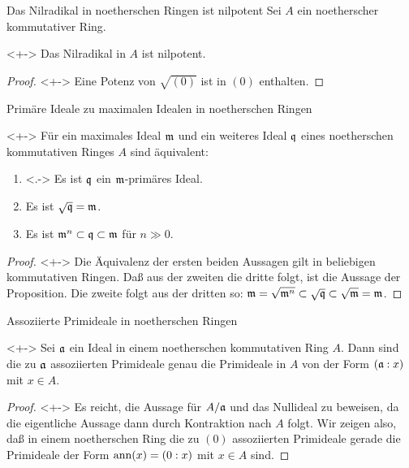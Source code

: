 \begin{frame}{Das Nilradikal in noetherschen Ringen ist nilpotent}
	Sei \(A\) ein noetherscher kommutativer Ring.
	\begin{corollary}<+->
		Das Nilradikal in \(A\) ist nilpotent.
	\end{corollary}
	\begin{proof}<+->
		Eine Potenz von \(\sqrt{(0)}\) ist in \((0)\) enthalten.
	\end{proof}
\end{frame}

\begin{frame}{Primäre Ideale zu maximalen Idealen in noetherschen Ringen}
	\begin{corollary}<+->
		Für ein maximales Ideal \(\mathfrak{m}\) und ein weiteres Ideal \(\mathfrak{q}\) eines
		noetherschen kommutativen Ringes \(A\) sind
		äquivalent:
		\begin{enumerate}[<+->]
		\item<.->
			Es ist \(\mathfrak{q}\) ein \(\mathfrak{m}\)-primäres Ideal.
		\item
			Es ist \(\sqrt{\mathfrak{q}} = \mathfrak{m}\).
		\item
			Es ist \(\mathfrak{m}^n \subset \mathfrak{q} \subset \mathfrak{m}\) für \(n \gg 0\).
		\end{enumerate}
	\end{corollary}
	\begin{proof}<+->
		Die Äquivalenz der ersten beiden Aussagen gilt in beliebigen kommutativen Ringen. Daß aus der
		zweiten die dritte folgt, ist die Aussage der Proposition. Die zweite folgt aus der dritten so:
		\(\mathfrak{m} = \sqrt{\mathfrak{m}^n} \subset \sqrt{\mathfrak{q}} \subset \sqrt{\mathfrak{m}} = \mathfrak{m}\).
	\end{proof}
\end{frame}

\begin{frame}{Assoziierte Primideale in noetherschen Ringen}
	\begin{proposition}<+->
		Sei \(\mathfrak{a}\) ein Ideal in einem noetherschen kommutativen Ring \(A\). Dann sind die
		zu \(\mathfrak{a}\) assoziierten Primideale genau die Primideale in \(A\) von der Form
		\((\mathfrak{a} : x)\) mit \(x \in A\).
	\end{proposition}
	\begin{proof}<+->
		Es reicht, die Aussage für \(A/\mathfrak{a}\) und das Nullideal zu beweisen, da die eigentliche
		Aussage dann durch Kontraktion nach \(A\) folgt. Wir zeigen also, daß in einem noetherschen
		Ring die zu \((0)\) assoziierten Primideale gerade die Primideale der Form \(\operatorname{ann}(x) = (0 : x)\)
		mit \(x \in A\) sind.
		\renewcommand{\qedsymbol}{}
	\end{proof}
\end{frame}

